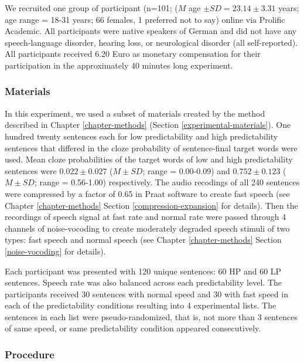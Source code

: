 \documentclass[a4paper, nobind]{templates/ociamthesis}
\begin{document}
We recruited one group of participant (n=101; (\(M\) age \(\pm SD=23.14\pm 3.31\) years; age range = 18-31 years; 66 females, 1 preferred not to say) online via Prolific Academic.
All participants were native speakers of German and did not have any speech-language disorder, hearing loss, or neurological disorder (all self-reported).
All participants received 6.20 Euro as monetary compensation for their participation in the approximately 40 minutes long experiment.

\hypertarget{materials-2}{%
\subsubsection{Materials}\label{materials-2}}

In this experiment, we used a subset of materials created by the method described in Chapter \ref{chapter-methods} (Section \ref{experimental-materials}).
One hundred twenty sentences each for low predictability and high predictability sentences that differed in the cloze probability of sentence-final target words were used.
Mean cloze probabilities of the target words of low and high predictability sentences were \(0.022\pm0.027\) (\(M\pm SD\); range = 0.00-0.09) and \(0.752\pm0.123\) (\(M\pm SD\); range = 0.56-1.00) respectively.
The audio recodings of all 240 sentences were compressed by a factor of 0.65 in Praat software to create fast speech (see Chapter \ref{chapter-methods} Section \ref{compression-expansion} for details).
Then the recordings of speech signal at fast rate and normal rate were passed through 4 channels of noise-vocoding to create moderately degraded speech stimuli of two types: fast speech and normal speech (see Chapter \ref{chapter-methods} Section \ref{noise-vocoding} for details).

Each participant was presented with 120 unique sentences: 60 HP and 60 LP sentences.
Speech rate was also balanced across each predictability level.
The participants received 30 sentences with normal speed and 30 with fast speed in each of the predictability conditions resulting into 4 experimental lists.
The sentences in each list were pseudo-randomized, that is, not more than 3 sentences of same speed, or same predictability condition appeared consecutively.

\hypertarget{procedure-3}{%
\subsubsection{Procedure}\label{procedure-3}}
\end{document}
